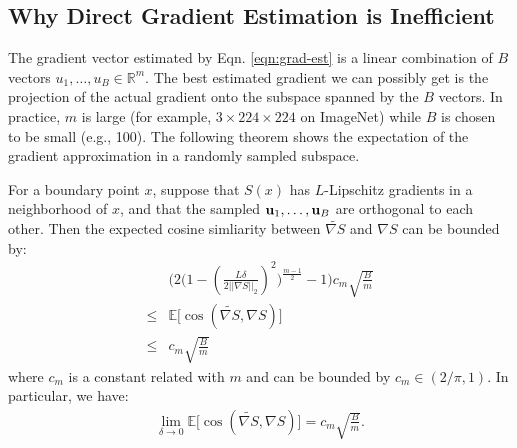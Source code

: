 \subsection{Why Direct Gradient Estimation is Inefficient}
The gradient vector estimated by Eqn. \ref{eqn:grad-est} is a linear combination of $B$ vectors $u_1,\ldots,u_B \in \mathbb{R}^m$.  The best estimated gradient we can possibly get is the projection of the actual gradient onto the subspace spanned by the $B$ vectors. In practice, $m$ is large (for example, $3\times224\times224$ on ImageNet) while $B$ is chosen to be small (e.g., 100). The following theorem shows the expectation of the gradient approximation in a randomly sampled subspace. 
\begin{theorem}
\label{tho:cos}
For a boundary point $x$, suppose that $S(x)$ has $L$-Lipschitz gradients in a neighborhood of $x$, and that the sampled ${\bf u}_1, \ldots, {\bf u}_B$ are orthogonal to each other. Then the expected cosine simliarity between $\widetilde{\nabla S}$ and $\nabla S$ can be bounded by:
\begin{align}
    & \bigg( 2\bigg(1-(\frac{L\delta}{2||\nabla S||_2})^2\bigg)^{\frac{m-1}{2}} - 1 \bigg)c_m\sqrt{\frac B m}\\
    \leq & \mathbb{E}\big[\cos (\widetilde{\nabla S}, \nabla S) \big]\\
    \leq & c_m\sqrt{\frac B m}
\end{align}
where $c_m$ is a constant related with $m$ and can be bounded by $c_m \in (2/\pi, 1)$. In particular, we have:
\begin{align}
    \label{eqn:grad-est-qual}
    \lim_{\delta\rightarrow 0}\mathbb{E}\big[\cos (\widetilde{\nabla S}, \nabla S) \big] = c_m\sqrt{\frac B m}.
\end{align}
\end{theorem}
